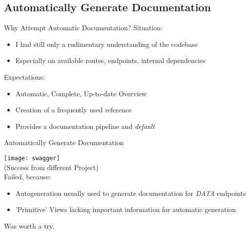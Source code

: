 \subsection{Automatically Generate Documentation}

\begin{frame}[c]{Why Attempt Automatic Documentation?} 
    \large
    Situation:
    \begin{itemize}[<+(1)->]
        \item I had still only a rudimentary understanding of the codebase
        \item Especially on available routes, endpoints, internal dependencies
    \end{itemize}
    \pause
    Expectations:
    \begin{itemize}[<+(1)->]
        \item Automatic, Complete, Up-to-date Overview
        \item Creation of a frequently used reference
        \item Provides a documentation pipeline and {\em default}
    \end{itemize}
\end{frame}

\begin{frame}[c]{Automatically Generate Documentation}
    \begin{multicols}{2}
        \texttt{[image: swagger]} \\
        (Success from different Project) \\
        \large
        Failed, because:
        \begin{itemize}[<+(1)->]
            \item Autogeneration usually used to generate documentation for {\em DATA} endpoints
            \item 'Primitive' Views lacking important information for automatic generation
        \end{itemize}
        \pause
        Was worth a try.
    \end{multicols}
\end{frame}

